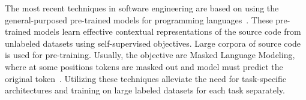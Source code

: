 \documentclass{article}
\begin{document}
The most recent techniques in software engineering are based on using the general-purposed pre-trained models for programming languages~\cite{karampatsis2020scelmo,guo2021graphcodebert}. These pre-trained models learn effective contextual representations of the source code from unlabeled datasets using self-supervised objectives. Large corpora of source code is used for pre-training. Usually, the objective are Masked Language Modeling, where at some positions tokens are masked out and model must predict the original token~\cite{FengEtAl2020}. 
Utilizing these techniques alleviate the need for task-specific architectures and training on large labeled datasets for each task separately.


\begin{comment}

\section{RQ5. How the code representation affects the prediction quality?}

In order to work with the source code, you need to have some representation.
On the one hand the representation should be simple as a vector, since most of machine learning algorithms work with vectors.
On the other hand the representation should contain all necessary information.
There are different ways to build representations for the source code (e.g., \cite{AllamanisEtAl2018}, \cite{ChenMonperrus2019}).

One way is to create the vector from {\it hand crafted} features.
This approach assumes that an expert invents a set of features and selects best of them. (e.g., \cite{SharminEtAl2015}).
Usually, these features include the statistical characteristics of code, such as its size, code complexity, code churn, or process metrics.

Other way is to view code as a {\it sequence} of elements, usually code tokens or characters.
Most sequence-based models are trained to predict sequences by generating the subsequent element.

One more approach to build the representation of the source code is {\it abstract syntax trees} (AST).
Such models make simplifying assumptions about how a tree is generated, usually following generative NLP models of syntactic trees:
 they start from a root node, then sequentially generate children top-to-bottom and left-to-right.
Syntactic models are trained to generate a tree node conditioned on context defined as the forest of subtrees generated so far.
In contrast to sequence models, these models --- by construction --- generate syntactically correct code.


\end{comment}
\end{document}

